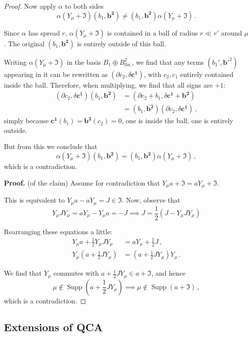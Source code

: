 \documentclass[aps,twocolumn,prx,floatfix,preprintnumbers, nofootinbib,10pt]{revtex4-2}
\numberwithin{equation}{section}
\theoremstyle{definition}
\theoremstyle{remark}
\theoremstyle{claim}
\newcommand{\be}{\begin{equation}}
\newcommand{\ee}{\end{equation}}
\newcommand{\paren}[1]{\left( #1 \right)}
\begin{document}
\begin{proof}
 Now apply $\alpha$ to both sides
 \be
 \alpha(Y_\mu + \mathfrak{I}) (b_1, \bm{b^2}) \neq (b_1, \bm{b^2}) \alpha(Y_\mu + \mathfrak{I}) \,.
 \ee

 Since $\alpha$ has spread $r$, $\alpha(Y_\mu + \mathfrak{I})$ is contained in a ball of radius $r \ll r'$ around $\mu$. The original $(b_1, \bm{b^2})$ is entirely outside of this ball.

 Writing $\alpha(Y_\mu + \mathfrak{I})$ in the basis $B_1 \oplus B^2_\text{fin.}$, we find that any terms $(b_1', \bm{b}'^2)$ appearing in it can be rewritten as $(\partial c_2, \delta \bm{c^1})$, with $c_2, c_1$ entirely contained inside the ball. Therefore, when multiplying, we find that all signs are $+1$:
 \begin{align}
  (\partial c_2, \delta \bm{c^1}) (b_1, \bm{b^2}) &= (\partial c_2 + b_1, \delta \bm{c^1} + \bm{b^2}) \nonumber \\
  &= (b_1, \bm{b^2}) (\partial c_2, \delta \bm{c^1}) \,,
 \end{align}
 simply because $\bm{c^1} (b_1) = \bm{b^2}(c_2) = 0$, one is inside the ball, one is entirely outside.

 But from this we conclude that
 \be
 \alpha(Y_\mu + \mathfrak{I}) (b_1, \bm{b^2}) = (b_1, \bm{b^2}) \alpha(Y_\mu + \mathfrak{I}) \,,
 \ee
 which is a contradiction.

 \textbf{Proof.} (of the claim) Assume for contradiction that $Y_\mu a + \mathfrak{I} = a Y_\mu + \mathfrak{I}$.

 This is equivalent to $Y_\mu a - a Y_\mu = J \in \mathfrak{I}$. Now, observe that
 \be
 Y_\mu J Y_\mu = a Y_\mu - Y_\mu a = - J \implies J = \frac{1}{2} \paren{J - Y_\mu J Y_\mu}
 \ee

 Rearranging these equations a little:
 \begin{align}
  Y_\mu a + \frac{1}{2} Y_\mu J Y_\mu &= a Y_\mu + \frac{1}{2} J \,, \nonumber \\
  Y_\mu \paren{a + \frac{1}{2} J Y_\mu} &= \paren{a + \frac{1}{2} J Y_\mu} Y_\mu \,.
 \end{align}

 We find that $Y_\mu$ commutes with $a + \frac{1}{2} J Y_\mu \in a + \mathfrak{I}$, and hence
 \be
 \mu \notin \operatorname{Supp}\paren{a + \frac{1}{2} J Y_\mu} \implies \mu \notin \operatorname{Supp}(a + \mathfrak{I}) \,,
 \ee
 which is a contradiction.
\end{proof}

\subsection{Extensions of QCA}\label{app:extensions_of_qca}
\end{document}
